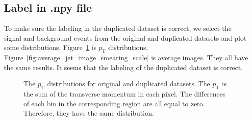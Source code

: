 \documentclass[12pt]{article}
\begin{document}
    \subsection{Label in .npy file}%
    \label{sub:label_in_npy_file}
        To make sure the labeling in the duplicated dataset is correct, we select the signal and background events from the original and duplicated datasets and plot some distributions. Figure~\ref{fig:pt_distribution_at_npy} is $p_{\text{T}}$ distributions. Figure~\ref{fig:average_jet_image_smearing_scale} is average images. They all have the same results. It seems that the labeling of the duplicated dataset is correct.
        \begin{figure}[htpb]
            \centering
            \caption{The $p_{\text{T}}$ distributions for original and duplicated datasets. The $p_{\text{T}}$ is the sum of the transverse momentum in each pixel. The differences of each bin in the corresponding region are all equal to zero. Therefore, they have the same distribution.}
            \label{fig:pt_distribution_at_npy}
        \end{figure}
\end{document}
